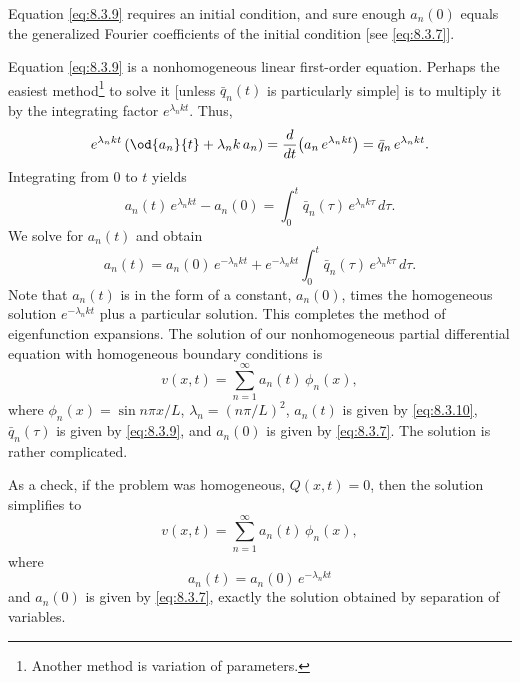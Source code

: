 Equation \eqref{eq:8.3.9} requires an initial condition, and sure enough $a_n(0)$ equals the generalized Fourier coefficients of the initial condition [see \eqref{eq:8.3.7}].

Equation \eqref{eq:8.3.9} is a nonhomogeneous linear first-order equation.  Perhaps the easiest method\footnote{Another method is variation of parameters.} to solve it [unless $\bar{q}_n(t)$ is particularly simple] is to multiply it by the integrating factor $e^{\lambda_n kt}$.  Thus,
\[
e^{\lambda_n kt}\left(\od{a_n}{t} + \lambda_n k\,a_n\right)
= \frac{d}{d t}\bigl(a_n\,e^{\lambda_n kt}\bigr)
= \bar{q}_n\,e^{\lambda_n kt}.
\]
Integrating from $0$ to $t$ yields
\[
a_n(t)\,e^{\lambda_n kt} - a_n(0) = \int_0^t \bar{q}_n(\tau)\,e^{\lambda_n k\tau}\,d\tau.
\]
We solve for $a_n(t)$ and obtain
\begin{equation}
\label{eq:8.3.10}
\boxed{a_n(t) = a_n(0)\,e^{-\lambda_n kt} + e^{-\lambda_n kt}\int_0^t \bar{q}_n(\tau)\,e^{\lambda_n k\tau}\,d\tau.}
\end{equation}
Note that $a_n(t)$ is in the form of a constant, $a_n(0)$, times the homogeneous solution $e^{-\lambda_n kt}$ plus a particular solution.  This completes the method of eigenfunction expansions.  The solution of our nonhomogeneous partial differential equation with homogeneous boundary conditions is
\[
v(x,t) = \sum_{n=1}^{\infty} a_n(t)\,\phi_n(x),
\]
where $\phi_n(x) = \sin n\pi x/L$, $\lambda_n = (n\pi/L)^2$, $a_n(t)$ is given by \eqref{eq:8.3.10}, $\bar{q}_n(\tau)$ is given by \eqref{eq:8.3.9}, and $a_n(0)$ is given by \eqref{eq:8.3.7}.  The solution is rather complicated.

As a check, if the problem was homogeneous, $Q(x,t) = 0$, then the solution simplifies to
\[
v(x,t) = \sum_{n=1}^{\infty} a_n(t)\,\phi_n(x),
\]
where
\[
a_n(t) = a_n(0)\,e^{-\lambda_n kt}
\]
and $a_n(0)$ is given by \eqref{eq:8.3.7}, exactly the solution obtained by separation of variables.

